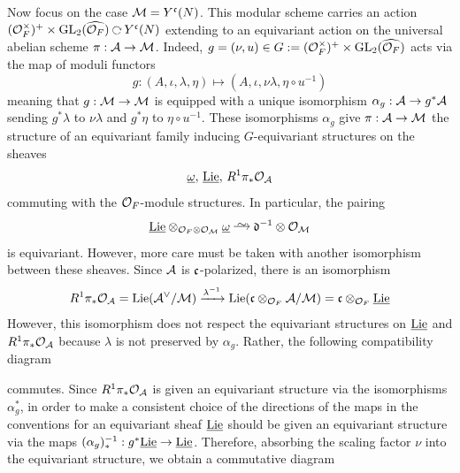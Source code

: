 \documentclass[main.tex]{subfiles}
\begin{document}
Now focus on the case $\mathcal{M} = Y^{\mathfrak{c}}(N)$. This modular scheme carries an action $(\cO_F^\times)^+ \times \GL_2(\widehat{\cO_F}) \acts Y^{\cc}(N)$ extending to an equivariant action on the universal abelian scheme $\pi : \mathcal{A} \to \mathcal{M}$. Indeed, $g = (\nu, u) \in G := (\mathcal{O}_F^\times)^+ \times \mathrm{GL}_2(\widehat{\mathcal{O}_F})$ acts via the map of moduli functors
\[ g : (A, \iota, \lambda, \eta) \mapsto (A, \iota, \nu \lambda, \eta \circ u^{-1}) \]
meaning that $g : \mathcal{M} \to \mathcal{M}$ is equipped with a unique isomorphism $\alpha_g :  \mathcal{A} \to g^* \mathcal{A}$ sending $g^* \lambda$ to $\nu \lambda$ and $g^* \eta$ to $\eta \circ u^{-1}$. These isomorphisms $\alpha_g$ give $\pi : \mathcal{A} \to \mathcal{M}$ the structure of an equivariant family inducing $G$-equivariant structures on the sheaves
\[ \underline{\omega}, \, \underline{\mathrm{Lie}}, \, R^1 \pi_* \mathcal{O}_{\mathcal{A}} \]
commuting with the $\mathcal{O}_F$-module structures. In particular, the pairing
\[ \ul{\Lie} \ot_{\cO_F \ot \cO_{\cM}} \ul{\omega} \iso \dd^{-1} \ot \cO_{\cM} \]
is equivariant. However, more care must be taken with another isomorphism between these sheaves. Since $\mathcal{A}$ is $\mathfrak{c}$-polarized, there is an isomorphism
\begin{equation} \label{eq:c-polarized_sheaf_identity}
R^1 \pi_* \mathcal{O}_{\mathcal{A}} = \mathrm{Lie}(\mathcal{A}^{\vee} / \mathcal{M}) \xrightarrow{\lambda^{-1}} \mathrm{Lie}(\mathfrak{c} \otimes_{\mathcal{O}_F} \mathcal{A} / \mathcal{M}) = \mathfrak{c} \otimes_{\mathcal{O}_F} \underline{\mathrm{Lie}}
\end{equation}  
However, this isomorphism does not respect the equivariant structures on $\underline{\mathrm{Lie}}$ and $R^1 \pi_* \mathcal{O}_{\mathcal{A}}$ because $\lambda$ is not preserved by $\alpha_g$. Rather, the following compatibility diagram
\begin{center}
\end{center}
commutes. Since $R^1 \pi_* \mathcal{O}_{\mathcal{A}}$ is given an equivariant structure via the isomorphisms $\alpha_g^*$, in order to make a consistent choice of the directions of the maps in the conventions for an equivariant sheaf $\underline{\mathrm{Lie}}$ should be given an equivariant structure via the maps $(\alpha_g)_*^{-1} : g^* \underline{\mathrm{Lie}} \to \underline{\mathrm{Lie}}$. Therefore, absorbing the scaling factor $\nu$ into the equivariant structure, we obtain a commutative diagram
\begin{center}
\end{center} 
\end{document}
